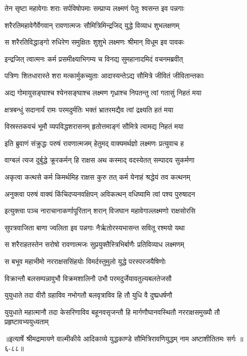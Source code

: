 \twolineshloka
{तेन सृष्टा महावेगाः शराः सर्पविषोपमाः}
{सम्प्राप्य लक्ष्मणं पेतुः श्वसन्त इव पन्नगाः} %

\twolineshloka
{शरैरतिमहावेगैर्वेगवान् रावणात्मजः}
{सौमित्रिमिन्द्रजिद् युद्धे विव्याध शुभलक्षणम्} %

\twolineshloka
{स शरैरतिविद्धाङ्गो रुधिरेण समुक्षितः}
{शुशुभे लक्ष्मणः श्रीमान् विधूम इव पावकः} %

\twolineshloka
{इन्द्रजित् त्वात्मनः कर्म प्रसमीक्ष्याभिगम्य च}
{विनद्य सुमहानादमिदं वचनमब्रवीत्} %

\twolineshloka
{पत्रिणः शितधारास्ते शरा मत्कार्मुकच्युताः}
{आदास्यन्तेऽद्य सौमित्रे जीवितं जीवितान्तकाः} %

\twolineshloka
{अद्य गोमायुसङ्घाश्च श्येनसङ्घाश्च लक्ष्मण}
{गृध्राश्च निपतन्तु त्वां गतासुं निहतं मया} %

\twolineshloka
{क्षत्रबन्धुं सदानार्यं रामः परमदुर्मतिः}
{भक्तं भ्रातरमद्यैव त्वां द्रक्ष्यति हतं मया} %

\twolineshloka
{विस्रस्तकवचं भूमौ व्यपविद्धशरासनम्}
{हृतोत्तमाङ्गं सौमित्रे त्वामद्य निहतं मया} %

\twolineshloka
{इति ब्रुवाणं संक्रुद्धः परुषं रावणात्मजम्}
{हेतुमद् वाक्यमर्थज्ञो लक्ष्मणः प्रत्युवाच ह} %

\twolineshloka
{वाग्बलं त्यज दुर्बुद्धे क्रूरकर्मन् हि राक्षस}
{अथ कस्माद् वदस्येतत् सम्पादय सुकर्मणा} %

\twolineshloka
{अकृत्वा कत्थसे कर्म किमर्थमिह राक्षस}
{कुरु तत् कर्म येनाहं श्रद्धेयं तव कत्थनम्} %

\twolineshloka
{अनुक्त्वा परुषं वाक्यं किंचिदप्यनवक्षिपन्}
{अविकत्थन् वधिष्यामि त्वां पश्य पुरुषादन} %

\twolineshloka
{इत्युक्त्वा पञ्च नाराचानाकर्णापूरितान् शरान्}
{विजघान महावेगाल्लक्ष्मणो राक्षसोरसि} %

\twolineshloka
{सुपत्रवाजिता बाणा ज्वलिता इव पन्नगाः}
{नैर्ऋतोरस्यभासन्त सवितू रश्मयो यथा} %

\twolineshloka
{स शरैराहतस्तेन सरोषो रावणात्मजः}
{सुप्रयुक्तैस्त्रिभिर्बाणैः प्रतिविव्याध लक्ष्मणम्} %

\twolineshloka
{स बभूव महाभीमो नरराक्षससिंहयोः}
{विमर्दस्तुमुलो युद्धे परस्परजयैषिणोः} %

\twolineshloka
{विक्रान्तौ बलसम्पन्नावुभौ विक्रमशालिनौ}
{उभौ परमदुर्जेयावतुल्यबलतेजसौ} %

\twolineshloka
{युयुधाते तदा वीरौ ग्रहाविव नभोगतौ}
{बलवृत्राविव हि तौ युधि वै दुष्प्रधर्षणौ} %

\threelineshloka
{युयुधाते महात्मानौ तदा केसरिणाविव}
{बहूनवसृजन्तौ हि मार्गणौघानवस्थितौ}
{नरराक्षसमुख्यौ तौ प्रहृष्टावभ्ययुध्यताम्} %


॥इत्यार्षे श्रीमद्रामायणे वाल्मीकीये आदिकाव्ये युद्धकाण्डे सौमित्रिरावणियुद्धम् नाम अष्टाशीतितमः सर्गः ॥६-८८॥
